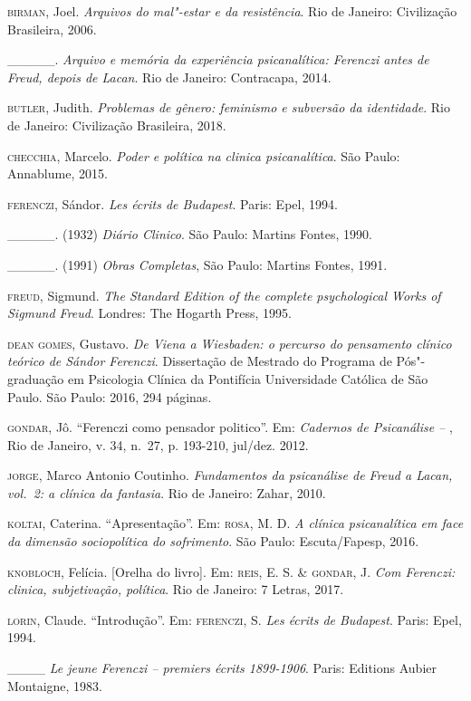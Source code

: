 \begin{Parskip}
\textsc{birman}, Joel. \emph{Arquivos do mal"-estar e da resistência}. Rio de Janeiro:
Civilização Brasileira, 2006.

\_\_\_\_\_. \emph{Arquivo e memória da experiência psicanalítica:
Ferenczi antes de Freud, depois de Lacan}. Rio de Janeiro: Contracapa, 2014.

\textsc{butler}, Judith. \emph{Problemas de gênero: feminismo e subversão da identidade}.
Rio de Janeiro: Civilização Brasileira, 2018.

\textsc{checchia}, Marcelo. \emph{Poder e política na clinica psicanalítica}. São Paulo:
Annablume, 2015.

\textsc{ferenczi}, Sándor. \emph{Les écrits de Budapest}. Paris: Epel, 1994.

\_\_\_\_\_. (1932) \emph{Diário Clinico}. São Paulo: Martins Fontes, 1990.

\_\_\_\_\_. (1991) \emph{Obras Completas}, São Paulo: Martins Fontes, 1991.

\textsc{freud}, Sigmund. \emph{The Standard Edition of the complete psychological Works of
Sigmund Freud}. Londres: The Hogarth Press, 1995.

\textsc{dean gomes}, Gustavo. \emph{De Viena a Wiesbaden: o percurso do pensamento clínico
teórico de Sándor Ferenczi}. Dissertação de Mestrado do Programa de
Pós"-graduação em Psicologia Clínica da Pontifícia Universidade Católica
de São Paulo. São Paulo: 2016, 294 páginas.

\textsc{gondar}, Jô. ``Ferenczi como pensador politico''. Em: \emph{Cadernos de Psicanálise --
}, Rio de Janeiro, v. 34, n.~27, p. 193-210, jul/dez. 2012.

\textsc{jorge}, Marco Antonio Coutinho. \emph{Fundamentos da psicanálise de Freud a Lacan, vol.~2: a clínica da fantasia}. Rio de Janeiro: Zahar, 2010.

\textsc{koltai}, Caterina. ``Apresentação''. Em: \textsc{rosa}, M. D. \emph{A clínica psicanalítica em face da dimensão sociopolítica do sofrimento}. São Paulo: Escuta/Fapesp, 2016.

\textsc{knobloch}, Felícia. {[}Orelha do livro{]}. Em: \textsc{reis}, E. S. \& \textsc{gondar}, J. \emph{Com Ferenczi: clinica, subjetivação, política}. Rio de Janeiro: 7 Letras, 2017.

\textsc{lorin}, Claude. ``Introdução''. Em: \textsc{ferenczi}, S. \emph{Les écrits de Budapest}. Paris: Epel, 1994.

\_\_\_\_ \emph{Le jeune Ferenczi -- premiers écrits 1899-1906}. Paris: Editions Aubier Montaigne, 1983.


\end{Parskip}
